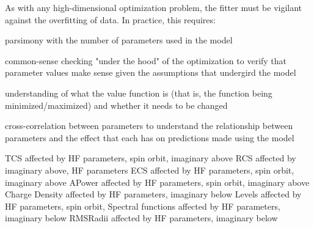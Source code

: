 As with any high-dimensional optimization problem, the fitter must be vigilant
against the overfitting of data. In practice, this requires:

parsimony with the number of parameters used in the model

common-sense checking "under the hood" of the optimization to verify that
parameter values make sense given the assumptions that undergird the model

understanding of what the value function is (that is, the function being
minimized/maximized) and whether it needs to be changed

cross-correlation between parameters to understand the relationship between
parameters and the effect that each has on predictions made using the model

TCS affected by HF parameters, spin orbit, imaginary above
RCS affected by imaginary above, HF parameters
ECS affected by HF parameters, spin orbit, imaginary above
APower affected by HF parameters, spin orbit,  imaginary above
Charge Density affected by HF parameters, imaginary below
Levels affected by HF parameters, spin orbit,
Spectral functions affected by HF parameters, imaginary below
RMSRadii affected by HF parameters, imaginary below

